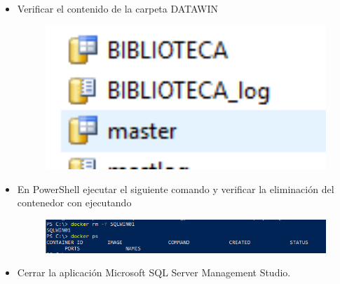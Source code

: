 \begin{itemize}
\begin{figure}[H]
\begin{center}
		\end{center}
		\end{figure}  
          \item Verificar el contenido de la carpeta DATAWIN
		\begin{figure}[H]
		\begin{center}
		\includegraphics[width=12cm]{./Imagenes/c8}
		\end{center}
		\end{figure}  
         \item En PowerShell ejecutar el siguiente comando y verificar la eliminación del contenedor con ejecutando
		\begin{figure}[H]
		\begin{center}
		\includegraphics[width=15cm]{./Imagenes/c9}
		\end{center}
		\end{figure}  
          \item Cerrar la aplicación Microsoft SQL Server Management Studio.
       
\end{itemize}
		